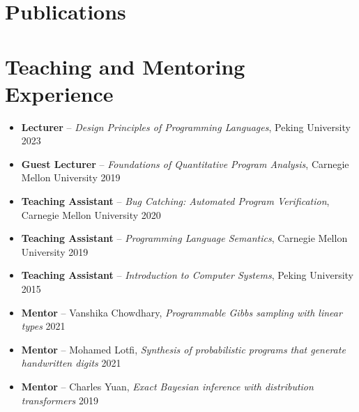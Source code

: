 \documentclass[11pt,letterpaper,roman]{moderncv}        %
\begin{document}
\section{Publications}
\vspace{4pt}

\section{Teaching and Mentoring Experience}

\begin{itemize}
  \item \textbf{Lecturer} -- \emph{Design Principles of Programming Languages}, Peking University \hfill 2023
  \item \textbf{Guest Lecturer} -- \emph{Foundations of Quantitative Program Analysis}, Carnegie Mellon University \hfill 2019

  \vspace{4pt}

  \item \textbf{Teaching Assistant} -- \emph{Bug Catching: Automated Program Verification}, Carnegie Mellon University \hfill 2020
  \item \textbf{Teaching Assistant} -- \emph{Programming Language Semantics}, Carnegie Mellon University \hfill 2019
  \item \textbf{Teaching Assistant} -- \emph{Introduction to Computer Systems}, Peking University \hfill 2015

  \vspace{4pt}

  \item \textbf{Mentor} -- Vanshika Chowdhary, \emph{Programmable Gibbs sampling with linear types} \hfill 2021
  \item \textbf{Mentor} -- Mohamed Lotfi, \emph{Synthesis of probabilistic programs that generate handwritten digits} \hfill 2021
  \item \textbf{Mentor} -- Charles Yuan, \emph{Exact Bayesian inference with distribution transformers} \hfill 2019
\end{itemize}
\end{document}
